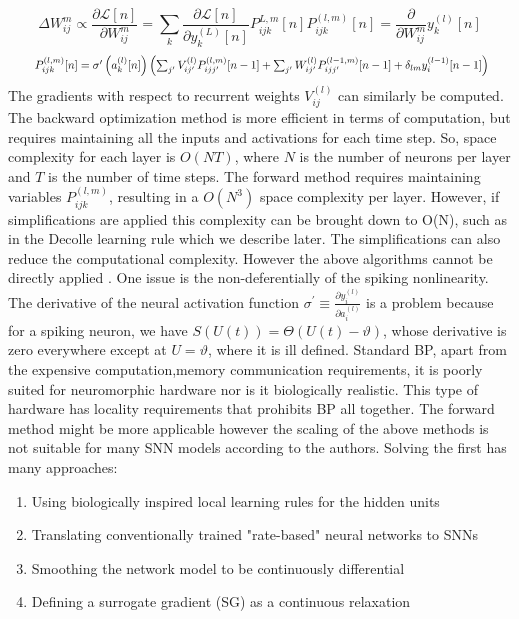 \documentclass[12pt]{report}
\begin{document}
\begin{equation*}
\Delta W_{i j}^{m} \propto \frac{\partial \mathcal{L}[n]}{\partial W_{i j}^{m}}=\sum_{k} \frac{\partial \mathcal{L}[n]}{\partial y_{k}^{(L)}[n]} P_{i j k}^{L, m}[n]
P_{i j k}^{(l, m)}[n]=\frac{\partial}{\partial W_{i j}^{m}} y_{k}^{(l)}[n]
\end{equation*}
\begin{equation*}
\resizebox{.95\hsize}{!}{
$P_{i j k}^{(l, m)}[n]=\sigma^{\prime}\left(a_{k}^{(l)}[n]\right)\left(\sum_{j^{\prime}} V_{i j^{\prime}}^{(l)} P_{i j j^{\prime}}^{(l, m)}[n-1]+\sum_{j^{\prime}} W_{i j^{\prime}}^{(l)} P_{i j j^{\prime}}^{(l-1, m)}[n-1]+\delta_{l m} y_{i}^{(l-1)}[n-1]\right)$}
\end{equation*}
The gradients with respect to recurrent weights $V_{i j}^{(l)}$  can similarly be computed. The backward optimization method is more efficient in terms of computation, but requires maintaining all the inputs and activations for each time step. So, space complexity for each layer is $O(N T)$, where $N$ is the number of neurons per layer and $T$ is the number of time steps. The forward method requires maintaining variables $P_{i j k}^{(l, m)}$, resulting in a $O\left(N^{3}\right)$ space complexity per layer. However, if simplifications are applied this complexity can be brought down to  O(N), such as in the Decolle learning rule which we describe later. The simplifications can also reduce the computational complexity.
However the above algorithms cannot be directly applied . One issue is the non-deferentially of the spiking nonlinearity. The derivative of the neural activation function $\sigma^{\prime} \equiv \frac{\partial y_{i}^{(l)}}{\partial a_{i}^{(l)}}$ is a problem because for a spiking neuron,  we have $S(U(t))=\Theta(U(t)-\vartheta)$, whose derivative is zero everywhere except at $U=\vartheta$, where it is ill defined. Standard BP, apart from the expensive computation,memory communication requirements, it is poorly suited for neuromorphic hardware nor is it biologically realistic. This type of hardware has locality requirements that prohibits BP all together. The forward method might be more applicable however the scaling of the above methods is not suitable for many SNN models according to the authors.
Solving the first has many approaches:
\begin{enumerate}
\item Using biologically inspired local learning rules for the hidden units
\item Translating conventionally trained "rate-based" neural networks to SNNs
\item Smoothing the network model to be continuously differential
\item Defining a surrogate gradient (SG) as a continuous relaxation
\end{enumerate}
\end{document}
